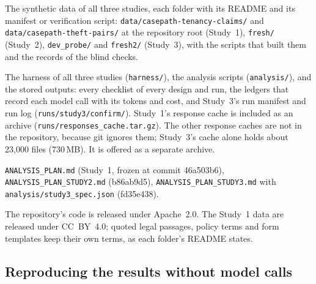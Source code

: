 {\begin{description}[leftmargin=1em,style=nextline,itemsep=2pt]
\item[The data] The synthetic data of all three studies, each folder with its README and its manifest or verification script: \texttt{data/\allowbreak{}casepath-tenancy-claims/} and \texttt{data/\allowbreak{}casepath-theft-pairs/} at the repository root (Study~1), \texttt{fresh/} (Study~2), \texttt{dev\_probe/} and \texttt{fresh2/} (Study~3), with the scripts that built them and the records of the blind checks.
\item[Harness, analysis and stored outputs] The harness of all three studies (\texttt{harness/}), the analysis scripts (\texttt{analysis/}), and the stored outputs: every checklist of every design and run, the ledgers that record each model call with its tokens and cost, and Study~3's run manifest and run log (\texttt{runs/\allowbreak{}study3/\allowbreak{}confirm/}). Study~1's response cache is included as an archive (\texttt{runs/\allowbreak{}responses\_cache.tar.gz}). The other response caches are not in the repository, because git ignores them; Study~3's cache alone holds about 23,000 files (730\,MB). It is offered as a separate archive.
\item[The frozen plans] \texttt{ANALYSIS\_PLAN.md} (Study~1, frozen at commit 46a503b6), \texttt{ANALYSIS\_\allowbreak{}PLAN\_\allowbreak{}STUDY2.md} (b86ab9d5), \texttt{ANALYSIS\_\allowbreak{}PLAN\_\allowbreak{}STUDY3.md} with \texttt{analysis/\allowbreak{}study3\_spec.json} (fd35e438).
\end{description}\par}
The repository's code is released under Apache~2.0. The Study~1 data are released under CC~BY~4.0; quoted legal passages, policy terms and form templates keep their own terms, as each folder's README states.

\subsection{Reproducing the results without model calls}
\label{app:release-reproduce}

